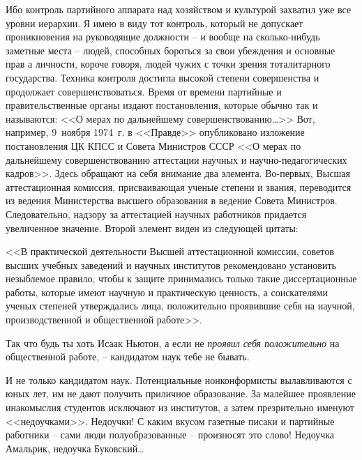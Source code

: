 \documentclass{book}
\begin{document}
Ибо контроль партийного аппарата над хозяйством и культурой захватил уже все уровни иерархии. Я имею в виду тот контроль, который не допускает проникновения на руководящие должности -- и вообще на сколько-нибудь заметные места -- людей, способных бороться за свои убеждения и основные прав а личности, короче говоря, людей чужих с  точки зрения тоталитарного государства. Техника контроля достигла высокой степени совершенства и продолжает совершенствоваться. Время от времени партийные и правительственные органы издают постановления, которые обычно так и называются: <<О мерах по дальнейшему совершенствованию\ldots>> Вот, например, 9~ноября 1974~г. в <<Правде>> опубликовано изложение постановления ЦК КПСС и Совета Министров СССР <<О мерах по дальнейшему совершенствованию аттестации научных и научно-педагогических кадров>>. Здесь обращают на себя внимание два элемента. Во-первых, Высшая аттестационная комиссия, присваивающая ученые степени и звания, переводится из ведения Министерства высшего образования в ведение 
Совета Министров. Следовательно, надзору за аттестацией научных работников придается увеличенное значение. Второй элемент виден из следующей цитаты:

<<В практической деятельности Высшей аттестационной комиссии, советов высших учебных заведений и научных институтов рекомендовано установить незыблемое правило, чтобы к защите принимались только такие диссертационные работы, которые имеют научную и практическую ценность, а соискате­лями ученых степеней утверждались лица, положительно проявившие себя на научной, производственной и общественной работе>>.

Так что будь ты хоть Исаак Ньютон, а если не \textit{проявил себя положительно} на общественной работе, -- кандидатом наук тебе не бывать.

И не только кандидатом наук. Потенциальные нонконформисты вылавливаются с юных лет, им не дают получить приличное образование. За малейшее проявление инакомыслия студентов исключают из институтов, а затем презрительно именуют <<недоучками>>. Недоучки! С каким вкусом газетные писаки и партийные работники -- сами люди полуобразованные -- произносят это слово! Недоучка Амальрик, недоучка Буковский\ldots
\end{document}
